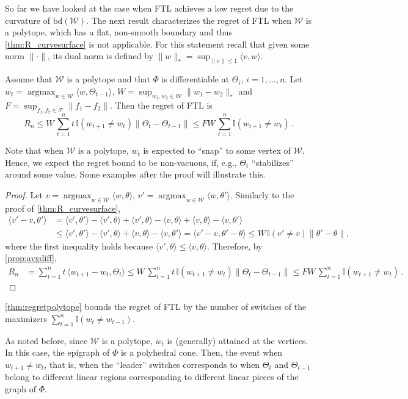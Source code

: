 \documentclass[english]{article}
\newcommand{\cW}{\mathcal{W}}
\newcommand{\cF}{\mathcal{F}}
\newcommand{\ind}{\mathbb{I}}
\newcommand{\inpro}[2]{\langle #1, #2\rangle}
\newcommand{\ip}[1]{\langle#1\rangle}
\newcommand{\norm}[1]{\left\| #1 \right\|}
\newcommand{\bd}{\mathrm{bd}}
\newcommand\numberthis{\addtocounter{equation}{1}\tag{\theequation}}
\DeclareMathOperator*{\argmax}{argmax}
\begin{document}
So far we have looked at the case when FTL achieves a low regret due to the curvature of $\bd(\cW)$.
The next result characterizes the regret of FTL when $\cW$ is a polytope, which has a flat, non-smooth boundary and thus \cref{thm:R_curvesurface} is not applicable. 
For this statement recall that given some norm $\|\cdot\|$,  its dual norm is defined by $\|w\|_* = \sup_{\|v\|\le 1} \inpro{v}{w}$.
\begin{theorem}
	\label{thm:regretpolytope}
	Assume that $\cW$ is a polytope
	and that $\Phi$ is differentiable at $\Theta_i$, $i= 1, \ldots, n$. 
	Let $w_t = \argmax_{w\in\cW} \inpro{w}{\Theta_{t-1}}$,
	$W = \sup_{w_1,w_2\in\cW}\|w_1 - w_2\|_*$ and $F = \sup_{f_1,f_2\in \cF} \norm{f_1-f_2}$.
	 Then the regret of FTL is 
	\[
	R_n \le W\, \sum_{t=1}^{n} t \,\ind(w_{t+1}\neq w_{t})  \|\Theta_t - \Theta_{t-1}\| \le FW\,\sum_{t=1}^{n} \ind(w_{t+1}\neq w_{t})\,.
	\]
\end{theorem}
Note that when $\cW$ is a polytope, $w_t$ is expected to ``snap'' to some vertex of $\cW$. Hence, 
we expect the regret bound to be non-vacuous, if, e.g., $\Theta_t$ ``stabilizes'' around some value. Some examples after the 
proof will illustrate this.
\begin{proof}
Let $v \!=\! \argmax_{w\in\cW} \inpro{w}{\theta}$, $v'\!=\!\argmax_{w\in \cW}\ip{w,\theta'}$. 
Similarly to the proof of \cref{thm:R_curvesurface},
	\begin{align*}
	\inpro{v'-v}{\theta'} & = \inpro{v'}{\theta'} - \inpro{v'}{\theta} + \inpro{v'}{\theta} - \inpro{v}{\theta} + \inpro{v}{\theta} -\inpro{v}{\theta'} \\
	& \le \inpro{v'}{\theta'} - \inpro{v'}{\theta} + \inpro{v}{\theta} -\inpro{v}{\theta'} %
	= \inpro{v' - v}{\theta' - \theta} 
	\le W\,\ind(v'\neq v)\|\theta' - \theta \|,
	\end{align*}
	where the first inequality %
	holds because $\inpro{v'}{\theta} \le \inpro{v}{\theta}$.
	Therefore, by \eqref{prop:avgdiff}, 
	\begin{align*}
	R_n & = \sum_{t=1}^n t\,\ip{ w_{t+1}-w_t,\Theta_t} 
	 \le W\,\sum_{t=1}^{n} t\, \ind(w_{t+1}\!\neq\! w_{t})  \|\Theta_t - \Theta_{t-1}\| 
	 \le FW\,\sum_{t=1}^{n} \ind(w_{t+1}\!\neq\! w_{t})\,.
	\end{align*}
\end{proof}
\begin{comm}
	\cref{thm:regretpolytope} bounds the regret of FTL by the number of switches of the maximizers $\sum_{t=1}^{n} \ind(w_t\neq w_{t-1})$.
\end{comm}
\fi
As noted before,  since $\cW$ is a polytope, $w_t$ is (generally) attained at the vertices. 
In this case, the epigraph of $\Phi$  is a polyhedral cone. Then, the event when $w_{t+1}\neq w_{t}$, that is, when 
	the ``leader'' switches corresponds to when 
	$\Theta_{t}$ and $\Theta_{t-1}$ belong to different linear regions corresponding to different linear pieces of the graph of $\Phi$.
\end{document}
